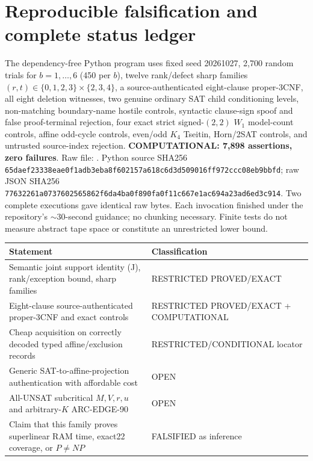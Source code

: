 \documentclass[11pt]{article}
\begin{document}
\section{Reproducible falsification and complete status ledger}
The dependency-free Python program  uses fixed seed 20261027, 2,700 random trials for $b=1,\dots,6$ (450 per $b$), twelve rank/defect sharp families $(r,t)\in\{0,1,2,3\}\times\{2,3,4\}$, a source-authenticated eight-clause proper-3CNF, all eight deletion witnesses, two genuine ordinary SAT child conditioning levels, non-matching boundary-name hostile controls, syntactic clause-sign spoof and false proof-terminal rejection, four exact strict signed-$(2,2)$ $W_1$ model-count controls, affine odd-cycle controls, even/odd $K_4$ Tseitin, Horn/2SAT controls, and untrusted source-index rejection. \textbf{COMPUTATIONAL: 7,898 assertions, zero failures}. Raw file:
. Python source SHA256 \texttt{65daef23338eae0f1adb3eba8f602157a618c6d3d509016ff972ccc08eb9bbfd}; raw JSON SHA256 \texttt{77632261a0737602565862f6da4ba0f890fa0f11c667e1ac694a23ad6ed3c914}. Two complete executions gave identical raw bytes. Each invocation finished under the repository's $\sim30$-second guidance; no chunking necessary. Finite tests do not measure abstract tape space or constitute an unrestricted lower bound.

\begin{center}\small
\begin{tabular}{p{.60\linewidth}l}\toprule
Statement & Classification\\\midrule
Semantic joint support identity (J), rank/exception bound, sharp families & RESTRICTED PROVED/EXACT\\
Eight-clause source-authenticated proper-3CNF and exact controls & RESTRICTED PROVED/EXACT + COMPUTATIONAL\\
Cheap acquisition on correctly decoded typed affine/exclusion records & RESTRICTED/CONDITIONAL locator\\
Generic SAT-to-affine-projection authentication with affordable cost & OPEN\\
All-UNSAT subcritical $M,V,r,u$ and arbitrary-$K$ ARC-EDGE-90 & OPEN\\
Claim that this family proves superlinear RAM time, exact22 coverage, or $P\ne NP$ & FALSIFIED as inference\\\bottomrule
\end{tabular}
\end{center}
\end{document}
